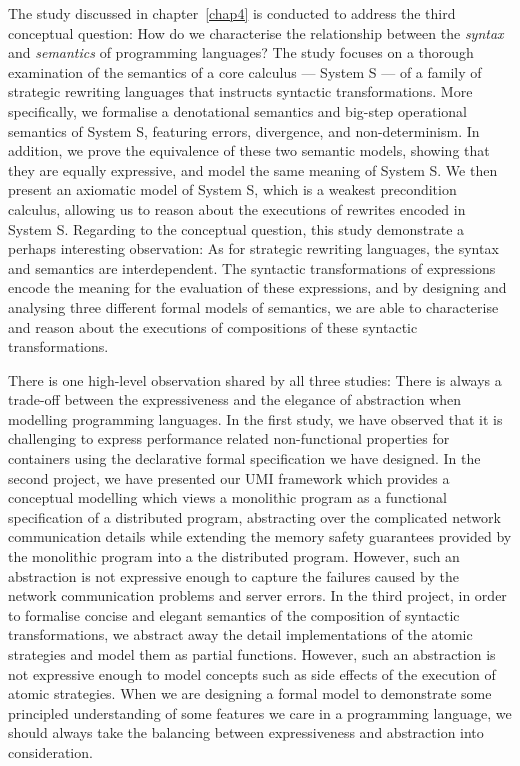 The study discussed in chapter~\ref{chap4} is conducted to address the third conceptual question: How do we characterise the relationship between the \emph{syntax} and \emph{semantics} of programming languages? The study focuses on a thorough examination of the semantics of a core calculus --- System S --- of a family of strategic rewriting languages that instructs syntactic transformations. More specifically, we formalise a denotational semantics and big-step operational semantics of System S, featuring errors, divergence, and non-determinism. In addition, we prove the equivalence of these two semantic models, showing that they are equally expressive, and model the same meaning of System S. We then present an axiomatic model of System S, which is a weakest precondition calculus, allowing us to reason about the executions of rewrites encoded in System S. Regarding to the conceptual question, this study demonstrate a perhaps interesting observation: As for strategic rewriting languages, the syntax and semantics are interdependent. The syntactic transformations of expressions encode the meaning for the evaluation of these expressions, and by designing and analysing three different formal models of semantics, we are able to characterise and reason about the executions of compositions of these syntactic transformations.

There is one high-level observation shared by all three studies: There is always a trade-off between the expressiveness and the elegance of abstraction when modelling programming languages. In the first study, we have observed that it is challenging to express performance related non-functional properties for containers using the declarative formal specification we have designed. In the second project, we have presented our UMI framework which provides a conceptual modelling which views a monolithic program as a functional specification of a distributed program, abstracting over the complicated network communication details while extending the memory safety guarantees provided by the monolithic program into a the distributed program. However, such an abstraction is not expressive enough to capture the failures caused by the network communication problems and server errors. In the third project, in order to formalise concise and elegant semantics of the composition of syntactic transformations, we abstract away the detail implementations of the atomic strategies and model them as partial functions. However, such an abstraction is not expressive enough to model concepts such as side effects of the execution of atomic strategies. When we are designing a formal model to demonstrate some principled understanding of some features we care in a programming language, we should always take the balancing between expressiveness and abstraction into consideration.

